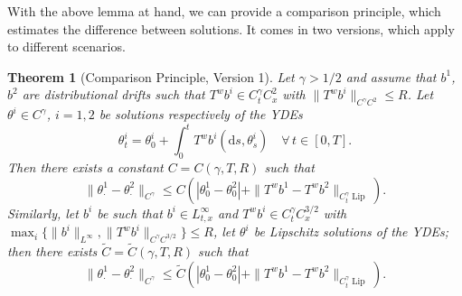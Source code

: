 \documentclass[10pt]{article}
\newcommand{\mathd}{\mathrm{d}}
\newcommand{\tmop}[1]{\ensuremath{\operatorname{#1}}}
\newtheorem{theorem}{Theorem}
\begin{document}
With the above lemma at hand, we can provide a comparison principle, which
estimates the difference between solutions. It comes in two versions, which
apply to different scenarios.

\begin{theorem}[Comparison Principle, Version 1]
  \label{sec4.1 comparison thm v1}Let $\gamma > 1 / 2$ and assume that $b^1$,
  $b^2$ are distributional drifts such that $T^w b^i \in C^{\gamma}_t C^2_x$
  with $\| T^w b^i \|_{C^{\gamma} C^2} \leqslant R$. Let $\theta^i \in
  C^{\gamma}$, $i = 1, 2$ be solutions respectively of the YDEs
  \[ \theta_t^i = \theta_0^i + \int_0^t T^w b^i (\mathd s, \theta^i_s)  \quad
     \forall \, t \in [0, T] . \]
  Then there exists a constant $C = C (\gamma, T, R)$ such that
  \begin{equation}
    \| \theta^1_{\cdot} - \theta^2_{\cdot} \|_{C^{\gamma}} \leqslant C (|
    \theta^1_0 - \theta^2_0 | + \| T^w b^1 - T^w b^2 \|_{C^{\gamma}_t
    \tmop{Lip}}) . \label{sec4.1 comparison v1.1}
  \end{equation}
  Similarly, let $b^i$ be such that $b^i \in L^{\infty}_{t, x}$ and $T^w b^i
  \in C^{\gamma}_t C^{3 / 2}_x$ with $\max_i \{ \| b^i \|_{L^{\infty}}, \| T^w
  b^i \|_{C^{\gamma} C^{3 / 2}} \} \leqslant R$, let $\theta^i$ be Lipschitz
  solutions of the YDEs; then there exists $\tilde{C} = \tilde{C} (\gamma, T,
  R)$ such that
  \begin{equation}
    \| \theta^1_{\cdot} - \theta^2_{\cdot} \|_{C^{\gamma}} \leqslant \tilde{C}
    (| \theta^1_0 - \theta^2_0 | + \| T^w b^1 - T^w b^2 \|_{C^{\gamma}_t
    \tmop{Lip}}) . \label{sec4.1 comparison v1.2}
  \end{equation}
\end{theorem}
\end{document}
